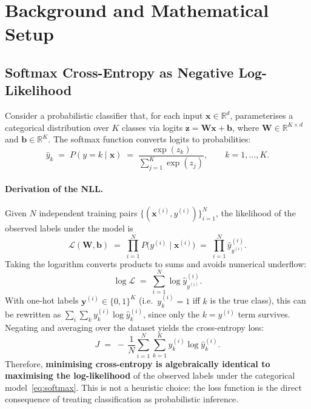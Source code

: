 \documentclass[11pt]{article}
\newcommand{\R}{\mathbb{R}}
\newcommand{\bx}{\mathbf{x}}
\newcommand{\bz}{\mathbf{z}}
\newcommand{\bW}{\mathbf{W}}
\newcommand{\bb}{\mathbf{b}}
\begin{document}
\section{Background and Mathematical Setup}

\subsection{Softmax Cross-Entropy as Negative Log-Likelihood}

Consider a probabilistic classifier that, for each input $\bx\in\R^d$, parameterises a
categorical distribution over $K$ classes via logits $\bz = \bW\bx + \bb$, where
$\bW\in\R^{K\times d}$ and $\bb\in\R^K$.  The softmax function converts logits to probabilities:
\begin{equation}\label{eq:softmax}
  \hat{y}_k \;=\; P(y{=}k\mid\bx)
  \;=\; \frac{\exp(z_k)}{\displaystyle\sum_{j=1}^{K}\exp(z_j)},
  \qquad k=1,\dots,K.
\end{equation}

\paragraph{Derivation of the NLL.}
Given $N$ independent training pairs $\{(\bx^{(i)},y^{(i)})\}_{i=1}^{N}$, the likelihood of the
observed labels under the model is
\[
  \mathcal{L}(\bW,\bb)
  \;=\;\prod_{i=1}^{N} P\!\bigl(y^{(i)}\mid\bx^{(i)}\bigr)
  \;=\;\prod_{i=1}^{N} \hat{y}_{y^{(i)}}^{(i)}.
\]
Taking the logarithm converts products to sums and avoids numerical underflow:
\[
  \log\mathcal{L}
  \;=\;\sum_{i=1}^{N} \log \hat{y}_{y^{(i)}}^{(i)}.
\]
With one-hot labels $\mathbf{y}^{(i)}\in\{0,1\}^K$ (i.e.\ $y^{(i)}_k=1$ iff $k$ is the true
class), this can be rewritten as
$\sum_{i}\sum_{k} y^{(i)}_k \log \hat{y}^{(i)}_k$,
since only the $k{=}y^{(i)}$ term survives.
Negating and averaging over the dataset yields the cross-entropy loss:
\begin{equation}\label{eq:ce}
  J \;=\; -\,\frac{1}{N}\sum_{i=1}^{N}\sum_{k=1}^{K} y_k^{(i)}\log\hat{y}_k^{(i)}.
\end{equation}
Therefore, \textbf{minimising cross-entropy is algebraically identical to maximising the
log-likelihood} of the observed labels under the categorical model~\eqref{eq:softmax}.
This is not a heuristic choice: the loss function is the direct consequence of treating
classification as probabilistic inference.
\end{document}
